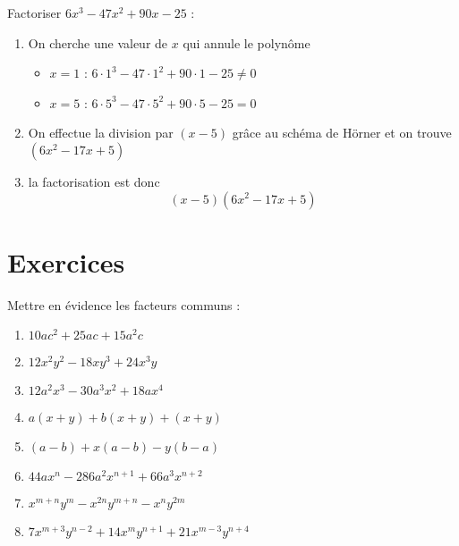 \begin{exemple}
Factoriser $6x^3 - 47 x^2 + 90 x - 25$ :
\begin{enumerate}
\item On cherche une valeur de $x$ qui annule le polynôme
	\begin{itemize}
	\item $x=1$ : $6 \cdot 1^3 - 47 \cdot 1^2 + 90 \cdot 1 - 25 \neq 0$
	\item $x=5$ : $6 \cdot 5^3 - 47 \cdot 5^2 + 90 \cdot 5 - 25 = 0$
	\end{itemize}
\item On effectue la division par $(x-5)$ grâce au schéma de Hörner et on trouve $(6x^2 - 17 x + 5)$
\item la factorisation est donc
$$
(x-5)(6x^2 - 17 x + 5)
$$
\end{enumerate}
\end{exemple}

\section{Exercices}


\begin{exercice}Mettre en évidence les facteurs communs :
\begin{multicols}{2}
\begin{enumerate}
\item $10a{{c}^{2}}+25ac+15{{a}^{2}}c$
\item $12{{x}^{2}}{{y}^{2}}-18x{{y}^{3}}+24{{x}^{3}}y$
\item $12{{a}^{2}}{{x}^{3}}-30{{a}^{3}}{{x}^{2}}+18a{{x}^{4}}$
\item $a(x+y)+b(x+y)+(x+y)$
\item $(a-b)+x(a-b)-y(b-a)$
\item $44a{{x}^{n}}-286{{a}^{2}}{{x}^{n+1}}+66{{a}^{3}}{{x}^{n+2}}$
\item ${{x}^{m+n}}{{y}^{m}}-{{x}^{2n}}{{y}^{m+n}}-{{x}^{n}}{{y}^{2m}}$
\item $7{{x}^{m+3}}{{y}^{n-2}}+14{{x}^{m}}{{y}^{n+1}}+21{{x}^{m-3}}{{y}^{n+4}}$
\end{enumerate}
\end{multicols}
\end{exercice}

